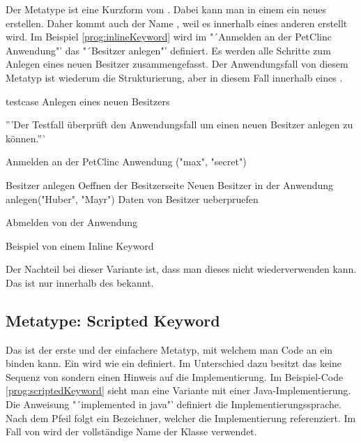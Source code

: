 Der Metatype  ist eine Kurzform vom . Dabei kann man in einem  ein neues  erstellen. Daher kommt auch der Name , weil es innerhalb eines anderen  erstellt wird. Im Beispiel \ref{prog:inlineKeyword} wird im  "´Anmelden an der PetClinc Anwendung"' das  "´Besitzer anlegen"' definiert. Es werden alle Schritte zum Anlegen eines neuen Besitzer zusammengefasst. Der Anwendungsfall von diesem Metatyp ist wiederum die Strukturierung, aber in diesem Fall innerhalb eines . 

\begin{program}
\begin{JavaCode}
testcase Anlegen eines neuen Besitzers {
	'''Der Testfall überprüft den Anwendungsfall um einen 
	   neuen Besitzer anlegen zu können.'''
	
	Anmelden an der PetClinc Anwendung ("max", "secret")
	
	Besitzer anlegen {
		Oeffnen der Besitzerseite		
		Neuen Besitzer in der Anwendung anlegen("Huber", "Mayr")
		Daten von Besitzer ueberpruefen
	}
	
	Abmelden von der Anwendung
}
\end{JavaCode}
\caption{Beispiel von einem Inline Keyword}
\label{prog:inlineKeyword}
\end{program}

\SuperPar
Der Nachteil bei dieser Variante ist, dass man dieses  nicht wiederverwenden kann. Das  ist nur innerhalb des  bekannt.


\subsection{Metatype: Scripted Keyword}

Das  ist der erste und der einfachere Metatyp, mit welchem man Code an ein  binden kann. Ein  wird wie ein  definiert. Im Unterschied dazu besitzt das  keine Sequenz von  sondern einen Hinweis auf die Implementierung. Im Beispiel-Code \ref{prog:scriptedKeyword} sieht man eine Variante mit einer Java-Implementierung. Die Anweisung "´implemented in java"' definiert die Implementierungssprache. Nach dem Pfeil folgt ein Bezeichner, welcher die Implementierung referenziert. Im Fall von  wird der vollständige Name der Klasse verwendet.

